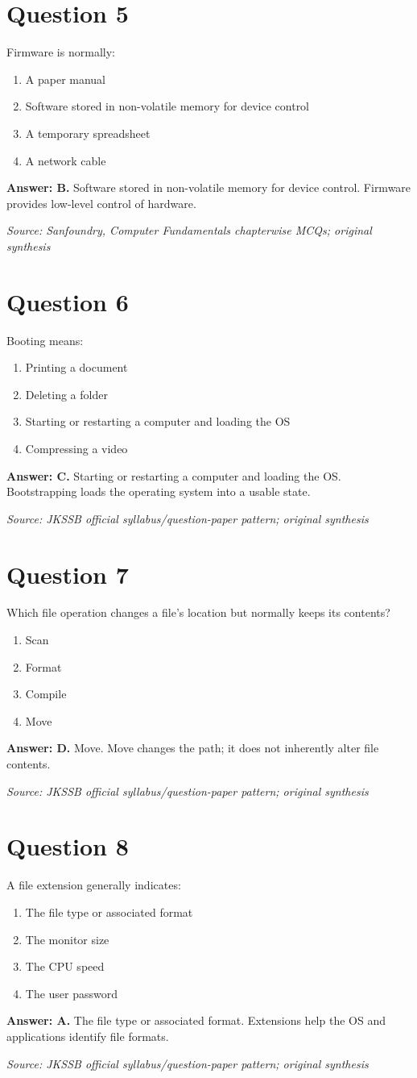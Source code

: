 \documentclass[11pt,a4paper]{book}
\newcommand{\source}[1]{\par\smallskip\textit{Source: #1}}
\newcommand{\answer}[2]{\par\textbf{Answer: #1.} #2}
\begin{document}
\section*{Question 5}
Firmware is normally:
\begin{enumerate}[label=\Alph*.]
\item A paper manual
\item Software stored in non-volatile memory for device control
\item A temporary spreadsheet
\item A network cable
\end{enumerate}
\answer{B}{Software stored in non-volatile memory for device control. Firmware provides low-level control of hardware.}
\source{Sanfoundry, Computer Fundamentals chapterwise MCQs; original synthesis}
\section*{Question 6}
Booting means:
\begin{enumerate}[label=\Alph*.]
\item Printing a document
\item Deleting a folder
\item Starting or restarting a computer and loading the OS
\item Compressing a video
\end{enumerate}
\answer{C}{Starting or restarting a computer and loading the OS. Bootstrapping loads the operating system into a usable state.}
\source{JKSSB official syllabus/question-paper pattern; original synthesis}
\section*{Question 7}
Which file operation changes a file’s location but normally keeps its contents?
\begin{enumerate}[label=\Alph*.]
\item Scan
\item Format
\item Compile
\item Move
\end{enumerate}
\answer{D}{Move. Move changes the path; it does not inherently alter file contents.}
\source{JKSSB official syllabus/question-paper pattern; original synthesis}
\section*{Question 8}
A file extension generally indicates:
\begin{enumerate}[label=\Alph*.]
\item The file type or associated format
\item The monitor size
\item The CPU speed
\item The user password
\end{enumerate}
\answer{A}{The file type or associated format. Extensions help the OS and applications identify file formats.}
\source{JKSSB official syllabus/question-paper pattern; original synthesis}
\end{document}
